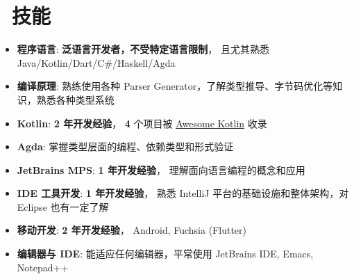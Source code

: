 \documentclass{resume}
\begin{document}
\section{\faCogs\ 技能}
\begin{itemize}[parsep=0.5ex]
  \item \textbf{程序语言}:
    \textbf{泛语言开发者，不受特定语言限制}，
    且尤其熟悉 Java/Kotlin/Dart/C\#/Haskell/Agda

  \item \textbf{编译原理}:
    熟练使用各种 Parser Generator，了解类型推导、字节码优化等知识，熟悉各种类型系统

  \item \textbf{Kotlin}:
    \textbf{2 年开发经验}，
    \textbf{4} 个项目被
    \href{https://kotlin.link/?q=ice} {Awesome Kotlin}
    收录

  \item \textbf{Agda}:
    掌握类型层面的编程、依赖类型和形式验证

  \item \textbf{JetBrains MPS}:
    \textbf{1 年开发经验}，
    理解面向语言编程的概念和应用

  \item \textbf{IDE 工具开发}:
    \textbf{1 年开发经验}，
    熟悉 IntelliJ 平台的基础设施和整体架构，对 Eclipse 也有一定了解

  \item \textbf{移动开发}:
    \textbf{2 年开发经验}，
    Android, Fuchsia (Flutter)

  \item \textbf{编辑器与 IDE}:
    能适应任何编辑器，平常使用 JetBrains IDE, Emacs, Notepad++
\end{itemize}

\end{document}
